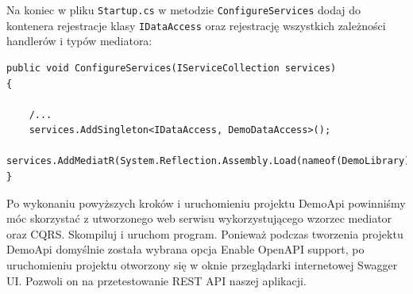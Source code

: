 Na koniec w pliku \texttt{Startup.cs} w metodzie \texttt{ConfigureServices} dodaj do kontenera rejestracje klasy \texttt{IDataAccess} oraz rejestrację wszystkich zależności handlerów i typów mediatora:
\begin{lstlisting}
public void ConfigureServices(IServiceCollection services)
{
	
	/...	
	services.AddSingleton<IDataAccess, DemoDataAccess>();
	services.AddMediatR(System.Reflection.Assembly.Load(nameof(DemoLibrary)));
}
\end{lstlisting}

Po wykonaniu powyższych kroków i uruchomieniu projektu DemoApi powinniśmy móc skorzystać z utworzonego web serwisu wykorzystującego wzorzec mediator oraz CQRS. Skompiluj i uruchom program. Ponieważ podczas tworzenia projektu DemoApi domyślnie została wybrana opcja Enable OpenAPI support, po uruchomieniu projektu otworzony się w oknie przeglądarki internetowej Swagger UI. Pozwoli on na przetestowanie REST API naszej aplikacji.
